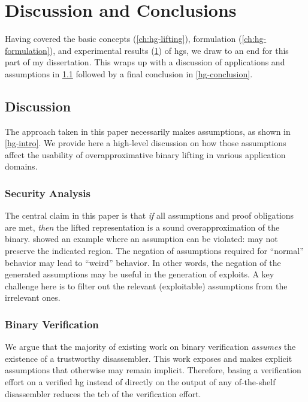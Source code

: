 \chapter{Discussion and Conclusions}\label{ch:hg-discussion}
Having covered the basic concepts (\cref{ch:hg-lifting}), formulation (\cref{ch:hg-formulation}), and experimental results (\cref{ch:hg-discussion}) of \acp{hg}, we draw to an end for this part of my dissertation.
This  wraps up with a discussion of applications and assumptions in \cref{hg-discussion} followed by a final conclusion in \cref{hg-conclusion}.

\section{Discussion}\label{hg-discussion}
The approach taken in this paper necessarily makes assumptions, as shown in \cref{hg-intro}.
We provide here a high-level discussion on how those assumptions affect the usability of overapproximative binary lifting in various application domains.

\subsection{Security Analysis}
The central claim in this paper is that \emph{if} all assumptions and proof obligations are met,
\emph{then} the lifted representation is a sound overapproximation of the binary.
 showed an example where an assumption can be violated:  may not preserve the indicated region.
The negation of assumptions required for ``normal'' behavior may lead to ``weird'' behavior.
In other words, the negation of the generated assumptions may be useful in the generation of exploits.
A key challenge here is to filter out the relevant (exploitable) assumptions from the irrelevant ones.

\subsection{Binary Verification}
We argue that the majority of existing work on binary verification \emph{assumes} the existence of a trustworthy disassembler.
This work exposes and makes explicit assumptions that otherwise may remain implicit.
Therefore, basing a verification effort on a verified \ac{hg} instead of directly on the output of any of-the-shelf disassembler reduces the \ac{tcb} of the verification effort.

